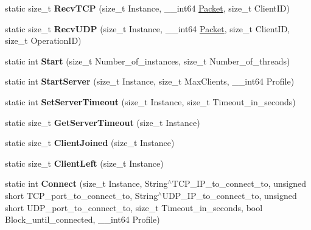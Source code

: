 \begin{DoxyCompactItemize}
\item 
\hypertarget{structmn_c_l_r_aaac970c53a6ba7ea97f9935435203d0f}{
static size\_\-t {\bfseries RecvTCP} (size\_\-t Instance, \_\-\_\-int64 \hyperlink{class_packet}{Packet}, size\_\-t ClientID)}
\label{structmn_c_l_r_aaac970c53a6ba7ea97f9935435203d0f}

\item 
\hypertarget{structmn_c_l_r_af5a05a4642f5150bc892f3e197a6237a}{
static size\_\-t {\bfseries RecvUDP} (size\_\-t Instance, \_\-\_\-int64 \hyperlink{class_packet}{Packet}, size\_\-t ClientID, size\_\-t OperationID)}
\label{structmn_c_l_r_af5a05a4642f5150bc892f3e197a6237a}

\item 
\hypertarget{structmn_c_l_r_a2fbb41f2cb230465e5f9a7daa77330a7}{
static int {\bfseries Start} (size\_\-t Number\_\-of\_\-instances, size\_\-t Number\_\-of\_\-threads)}
\label{structmn_c_l_r_a2fbb41f2cb230465e5f9a7daa77330a7}

\item 
\hypertarget{structmn_c_l_r_abe81e81794759d71c2d315797f7a3db3}{
static int {\bfseries StartServer} (size\_\-t Instance, size\_\-t MaxClients, \_\-\_\-int64 Profile)}
\label{structmn_c_l_r_abe81e81794759d71c2d315797f7a3db3}

\item 
\hypertarget{structmn_c_l_r_a14661ed4a5f7336cb15f91736b2d8f50}{
static int {\bfseries SetServerTimeout} (size\_\-t Instance, size\_\-t Timeout\_\-in\_\-seconds)}
\label{structmn_c_l_r_a14661ed4a5f7336cb15f91736b2d8f50}

\item 
\hypertarget{structmn_c_l_r_acf664b3f22f835dbc34b6bdaacb14a94}{
static size\_\-t {\bfseries GetServerTimeout} (size\_\-t Instance)}
\label{structmn_c_l_r_acf664b3f22f835dbc34b6bdaacb14a94}

\item 
\hypertarget{structmn_c_l_r_a0f7c3b7f035303121dee0f7b2b86f788}{
static size\_\-t {\bfseries ClientJoined} (size\_\-t Instance)}
\label{structmn_c_l_r_a0f7c3b7f035303121dee0f7b2b86f788}

\item 
\hypertarget{structmn_c_l_r_a25c4f1309e6646ea7c427762fcaf952a}{
static size\_\-t {\bfseries ClientLeft} (size\_\-t Instance)}
\label{structmn_c_l_r_a25c4f1309e6646ea7c427762fcaf952a}

\item 
\hypertarget{structmn_c_l_r_a0336a8a5123bd374411d7db9398d0f88}{
static int {\bfseries Connect} (size\_\-t Instance, String$^\wedge$TCP\_\-IP\_\-to\_\-connect\_\-to, unsigned short TCP\_\-port\_\-to\_\-connect\_\-to, String$^\wedge$UDP\_\-IP\_\-to\_\-connect\_\-to, unsigned short UDP\_\-port\_\-to\_\-connect\_\-to, size\_\-t Timeout\_\-in\_\-seconds, bool Block\_\-until\_\-connected, \_\-\_\-int64 Profile)}
\label{structmn_c_l_r_a0336a8a5123bd374411d7db9398d0f88}


\end{DoxyCompactItemize}
